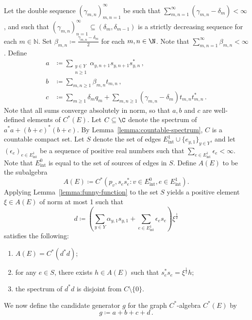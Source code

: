 \documentclass[12pt, a4paper]
{amsart}
\theoremstyle{definition}
\theoremstyle{remark}
\numberwithin{equation}{section}
\newcommand{\Eint}{E^0_{\mathrm{int}}}
\newcommand{\edgeint}{E^1_{\mathrm{int}}}
\newcommand{\Cstar}{\ensuremath{C^*}}
\begin{document}
Let the double sequence $(\gamma_{m,n})_{m,n=1}^\infty$ be such that $\sum_{m,n=1}^\infty (\gamma_{m,n}-\delta_m) < \infty$, and such that $(\gamma_{m,n})_{n=1}^\infty \subseteq (\delta_m, \delta_{m-1})$ is a strictly decreasing sequence for each $m \in \mathbb{N}$. Set ${\beta_{m,n} \coloneq \frac{\gamma_{m,n}-\delta_m}{2}}$ for each $m,n \in \N$. Note that $\sum_{m,n=1}^\infty \beta_{m,n}< \infty$. Define
\begin{align}
    a &\coloneq \sum_{\substack{y \in Y \\ n \ge 1}} \alpha_{y,n+1} s_{y,n+1} s_{y,n}^*\label{eq:a}\,,\\
    b &\coloneq \sum_{m,n \ge 1} \beta_{m,n} t_{m,n}\label{eq:b}\,, \\
    c &\coloneq \sum_{m \ge 1} \delta_m q_m + \sum_{m,n \ge 1} (\gamma_{m,n}-\delta_m) t_{m,n}t_{m,n}^*\label{eq:c}\,.
\end{align}
Note that all sums converge absolutely in norm, so that $a,b$ and $c$ are well-defined elements of $\Cstar(E)$.
Let $C \subseteq \C$ denote the spectrum of $a^*a + (b+c)^* (b+c)$. By Lemma~\ref{lemma:countable-spectrum}, $C$ is a countable compact set. Let $S$ denote the set of edges $\edgeint \cup \{e_{y,1}\}_{y \in Y}$, and let $(\epsilon_e)_{e \in \edgeint}$ be a sequence of positive real numbers such that $\sum_{e \in \edgeint} \epsilon_e < \infty$. Note that $\Eint$ is equal to the set of sources of edges in $S$. 
Define $A(E)$ to be the subalgebra 
\begin{equation}\label{AbelianSubalgebra}
    A(E) \coloneq \Cstar(p_v,s_e s_e^* \colon v \in \Eint, e \in \edgeint).
\end{equation}
Applying Lemma~\ref{lemma:funny-function} to the set $S$ yields a positive element $\xi \in A(E)$ of norm at most 1 such that
\begin{equation}\label{eq:d}
d \coloneq \left( \sum_{y \in Y} \alpha_{y,1} s_{y,1} + \sum_{e \in \edgeint} \epsilon_e s_e \right)\xi^{\frac{1}{2}}
\end{equation}
satisfies the following:
\begin{enumerate}[label=(\roman*)]
    \item $A(E) = \Cstar(d^*d)$;
    \item for any $e \in S$, there exists $h \in A(E)$ such that $s_e^*s_e = \xi^{\frac{1}{2}} h$;
    \item the spectrum of $d^*d$ is disjoint from $C \setminus \{0\}$.
\end{enumerate}
We now define the candidate generator $g$ for the graph $C^*$-algebra $C^*(E)$ by
\begin{equation}\label{generator}
    g \coloneq a+b+c+d    \,.
\end{equation}
\end{document}
